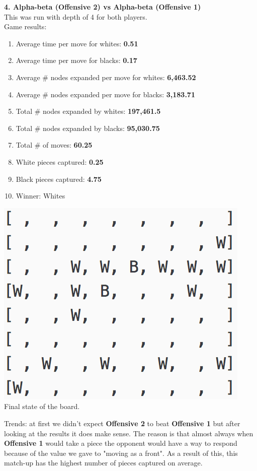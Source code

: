 \documentclass[11pt]{article}
\begin{document}
\pagebreak
\textbf{4. Alpha-beta (Offensive 2) vs Alpha-beta (Offensive 1)}\\
This was run with depth of 4 for both players.\\
Game results:\\
\begin{enumerate}
\item Average time per move for whites: \textbf{0.51}
\item Average time per move for blacks: \textbf{0.17}
\item Average \# nodes expanded per move for whites: \textbf{6,463.52}
\item Average \# nodes expanded per move for blacks:  \textbf{3,183.71}
\item Total \# nodes expanded by whites: \textbf{197,461.5}
\item Total \# nodes expanded by blacks: \textbf{95,030.75}
\item Total \# of moves: \textbf{60.25}
\item White pieces captured: \textbf{0.25}
\item Black pieces captured: \textbf{4.75}
\item Winner: Whites
\end{enumerate}
\begin{center}
\includegraphics[scale=1]{part2/ab-o2-vs-ab-o1.png}\\
Final state of the board.
\end{center}
Trends: at first we didn't expect \textbf{Offensive 2} to beat \textbf{Offensive 1} but after looking at the results it does make sense. The reason is that almost always when \textbf{Offensive 1} would take a piece the opponent would have a way to respond because of the value we gave to "moving as a front". As a result of this, this match-up has the highest number of pieces captured on average.\\
\end{document}
